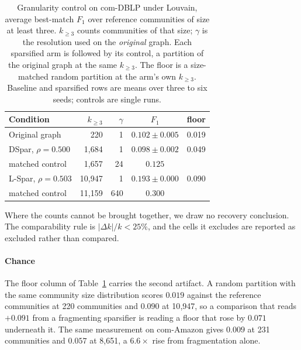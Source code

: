 \begin{table}[t]
\centering
\caption{Granularity control on com-DBLP under Louvain, average best-match $F_1$
over reference communities of size at least three. $k_{\geq 3}$ counts
communities of that size; $\gamma$ is the resolution used on the \emph{original}
graph. Each sparsified arm is followed by its control, a partition of the
original graph at the same $k_{\geq 3}$. The floor is a size-matched random
partition at the arm's own $k_{\geq 3}$. Baseline and sparsified rows are means
over three to six seeds; controls are single runs.}
\label{tab:granularity}
\small
\setlength{\tabcolsep}{4pt}
\begin{tabular}{@{}lrrcc@{}}
\toprule
Condition & $k_{\geq 3}$ & $\gamma$ & $F_1$ & floor\\
\midrule
Original graph               & 220    & 1   & $0.102 \pm 0.005$ & 0.019\\
DSpar, $\rho = 0.500$        & 1{,}684  & 1   & $0.098 \pm 0.002$ & 0.049\\
\quad matched control        & 1{,}657  & 24  & $0.125$           & \\
L-Spar, $\rho = 0.503$       & 10{,}947 & 1   & $0.193 \pm 0.000$ & 0.090\\
\quad matched control        & 11{,}159 & 640 & $0.300$           & \\
\bottomrule
\end{tabular}
\end{table}

Where the counts cannot be brought together, we draw no recovery conclusion. The
comparability rule is $|\Delta k|/k < 25\%$, and the cells it excludes are
reported as excluded rather than compared.

\paragraph{Chance}
The floor column of Table~\ref{tab:granularity} carries the second artifact. A
random partition with the same community size distribution scores $0.019$ against
the reference communities at 220 communities and $0.090$ at 10{,}947, so a
comparison that reads $+0.091$ from a fragmenting sparsifier is reading a floor
that rose by $0.071$ underneath it. The same measurement on com-Amazon gives
$0.009$ at 231 communities and $0.057$ at 8{,}651, a $6.6\times$ rise from
fragmentation alone.

